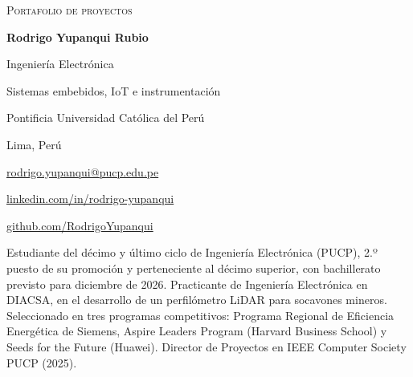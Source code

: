 \documentclass[10pt,a4paper]{article}
\newcommand{\sect}[1]{\par\vspace{5pt}{\color{navy}\scshape\bfseries\large #1}\par\vspace{1pt}{\color{rulegray}\hrule height 0.4pt}\vspace{3pt}}
\begin{document}
\begin{minipage}[b]{0.60\linewidth}
{\color{navy}\scshape\small Portafolio de proyectos}\par\vspace{1pt}
{\color{navy}\fontsize{25}{28}\selectfont\bfseries Rodrigo Yupanqui Rubio}\par\vspace{3pt}
{\normalsize Ingeniería Electrónica\par Sistemas embebidos, IoT e instrumentación}
\end{minipage}\hfill
\begin{minipage}[b]{0.38\linewidth}\raggedleft\small
Pontificia Universidad Católica del Perú\par
Lima, Perú\par
\href{mailto:rodrigo.yupanqui@pucp.edu.pe}{rodrigo.yupanqui@pucp.edu.pe}\par
\href{https://www.linkedin.com/in/rodrigo-yupanqui/}{linkedin.com/in/rodrigo-yupanqui}\par
\href{https://github.com/RodrigoYupanqui}{github.com/RodrigoYupanqui}
\end{minipage}
\par{}

\sect{Perfil}
Estudiante del décimo y último ciclo de Ingeniería Electrónica (PUCP), 2.º puesto de su promoción y perteneciente al décimo superior,
con bachillerato previsto para diciembre de 2026. Practicante de Ingeniería Electrónica en DIACSA, en el desarrollo de un perfilómetro LiDAR
para socavones mineros. Seleccionado en tres programas competitivos: Programa Regional de Eficiencia Energética de Siemens,
Aspire Leaders Program (Harvard Business School) y Seeds for the Future (Huawei). Director de Proyectos en IEEE Computer Society PUCP (2025).
\end{document}
